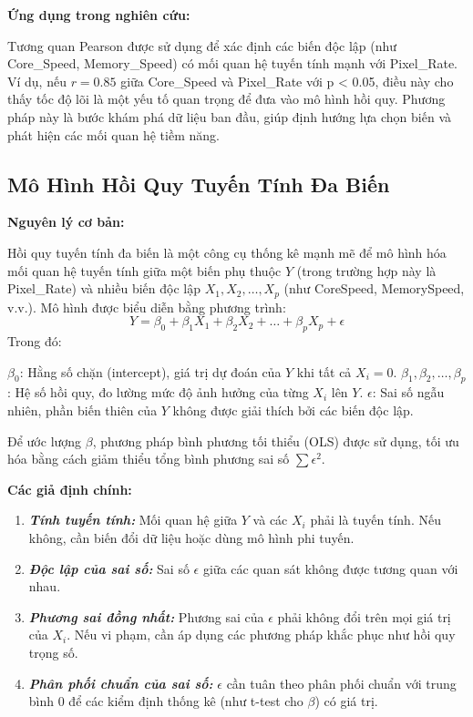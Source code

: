 \textbf{Ứng dụng trong nghiên cứu:}

Tương quan Pearson được sử dụng để xác định các biến độc lập (như Core\_Speed, Memory\_Speed) có mối quan hệ tuyến tính mạnh với Pixel\_Rate. Ví dụ, nếu $r = 0.85$ giữa Core\_Speed và Pixel\_Rate với p < 0.05, điều này cho thấy tốc độ lõi là một yếu tố quan trọng để đưa vào mô hình hồi quy. Phương pháp này là bước khám phá dữ liệu ban đầu, giúp định hướng lựa chọn biến và phát hiện các mối quan hệ tiềm năng.

\subsection{Mô Hình Hồi Quy Tuyến Tính Đa Biến}


\textbf{Nguyên lý cơ bản:}

Hồi quy tuyến tính đa biến là một công cụ thống kê mạnh mẽ để mô hình hóa mối quan hệ tuyến tính giữa một biến phụ thuộc $Y$ (trong trường hợp này là Pixel\_Rate) và nhiều biến độc lập $X_1, X_2, \dots, X_p$ (như CoreSpeed, MemorySpeed, v.v.). Mô hình được biểu diễn bằng phương trình:
$$Y = \beta_0 + \beta_1 X_1 + \beta_2 X_2 + \dots + \beta_p X_p + \epsilon$$
Trong đó:

$\beta_0$: Hằng số chặn (intercept), giá trị dự đoán của $Y$ khi tất cả $X_i = 0$.
$\beta_1, \beta_2, \dots, \beta_p$: Hệ số hồi quy, đo lường mức độ ảnh hưởng của từng $X_i$ lên $Y$.
$\epsilon$: Sai số ngẫu nhiên, phần biến thiên của $Y$ không được giải thích bởi các biến độc lập.

Để ước lượng $\beta$, phương pháp bình phương tối thiểu (OLS) được sử dụng, tối ưu hóa bằng cách giảm thiểu tổng bình phương sai số $\sum \epsilon^2$.


\textbf{Các giả định chính:}

\begin{enumerate}
    \item \textbf{\textit{Tính tuyến tính:}} Mối quan hệ giữa $Y$ và các $X_i$ phải là tuyến tính. Nếu không, cần biến đổi dữ liệu hoặc dùng mô hình phi tuyến.
    \item \textbf{\textit{Độc lập của sai số:}} Sai số $\epsilon$ giữa các quan sát không được tương quan với nhau.
    \item \textbf{\textit{Phương sai đồng nhất:}} Phương sai của $\epsilon$ phải không đổi trên mọi giá trị của $X_i$. Nếu vi phạm, cần áp dụng các phương pháp khắc phục như hồi quy trọng số.
    \item \textbf{\textit{Phân phối chuẩn của sai số:}} $\epsilon$ cần tuân theo phân phối chuẩn với trung bình 0 để các kiểm định thống kê (như t-test cho $\beta$) có giá trị.
\end{enumerate}



